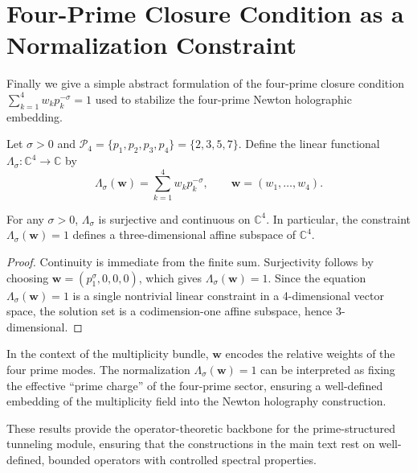 \documentclass[11pt]{article}
\begin{document}
\section{Four-Prime Closure Condition as a Normalization Constraint}

Finally we give a simple abstract formulation of the four-prime closure
condition
\(\sum_{k=1}^{4} w_k p_k^{-\sigma} = 1\) used to stabilize the
four-prime Newton holographic embedding.

\begin{definition}
Let \(\sigma>0\) and \(\mathcal{P}_4=\{p_1,p_2,p_3,p_4\}=\{2,3,5,7\}\).
Define the linear functional
\(\Lambda_\sigma : \mathbb{C}^4 \to \mathbb{C}\) by
\begin{equation}
  \Lambda_\sigma(\bm{w})
  = \sum_{k=1}^{4} w_k p_k^{-\sigma},
  \qquad \bm{w}=(w_1,\dots,w_4).
\end{equation}
\end{definition}

\begin{lemma}
For any \(\sigma>0\), \(\Lambda_\sigma\) is surjective and continuous
on \(\mathbb{C}^4\). In particular, the constraint
\(\Lambda_\sigma(\bm{w}) = 1\) defines a three-dimensional affine
subspace of \(\mathbb{C}^4\).
\end{lemma}

\begin{proof}
Continuity is immediate from the finite sum. Surjectivity follows by
choosing \(\bm{w}=(p_1^{\sigma},0,0,0)\), which gives
\(\Lambda_\sigma(\bm{w})=1\). Since the equation
\(\Lambda_\sigma(\bm{w})=1\) is a single nontrivial linear constraint in
a 4-dimensional vector space, the solution set is a codimension-one
affine subspace, hence 3-dimensional.
\end{proof}

In the context of the multiplicity bundle, \(\bm{w}\) encodes the
relative weights of the four prime modes. The normalization
\(\Lambda_\sigma(\bm{w})=1\) can be interpreted as fixing the effective
“prime charge” of the four-prime sector, ensuring a well-defined
embedding of the multiplicity field into the Newton holography
construction.

\bigskip

These results provide the operator-theoretic backbone for the
prime-structured tunneling module, ensuring that the constructions in
the main text rest on well-defined, bounded operators with controlled
spectral properties.


\nocite{*}
  

\end{document}
